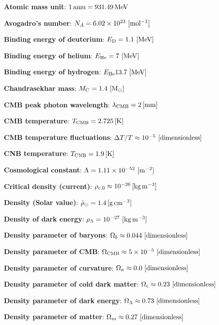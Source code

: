 \documentclass[a4paper,10pt]{article}
\begin{document}
{\noindent}\textbf{Atomic mass unit}: $1\,{\rm amu} = 931.49\,{\rm MeV}$

{\noindent}\textbf{Avogadro's number}: $N_A=6.02\times10^{23} ~ [{\rm mol^{-1}}]$

{\noindent}\textbf{Binding energy of deuterium}: $E_\mathrm{D} = 1.1 ~ [{\rm MeV}]$

{\noindent}\textbf{Binding energy of helium}: $E_\mathrm{He} = 7 ~ [{\rm MeV}]$

{\noindent}\textbf{Binding energy of hydrogen}: $E_\mathrm{He} 13.7 ~ [{\rm MeV}]$

{\noindent}\textbf{Chandrasekhar mass}: $M_C = 1.4 ~ [{\rm M_\odot}]$

{\noindent}\textbf{CMB peak photon wavelength}: $\lambda_\mathrm{CMB} = 2\,[{\rm mm}]$

{\noindent}\textbf{CMB temperature}: $T_\mathrm{CMB} = 2.725\,[{\rm K}]$

{\noindent}\textbf{CMB temperature fluctuations}: $\Delta T/T\approx10^{-5} ~ [{\rm dimensionless}]$

{\noindent}\textbf{CNB temperature}: $T_\mathrm{CNB} = 1.9\,[{\rm K}]$

{\noindent}\textbf{Cosmological constant}: $\Lambda=1.11\times10^{-52} ~ [{\rm m^{-2}}]$

{\noindent}\textbf{Critical density (current)}: $\rho_{c,0}\approx10^{-26}\,[{\rm kg\,m^{-3}}]$

{\noindent}\textbf{Density (Solar value)}: $\bar{\rho}_\odot = 1.4\,[{\rm g\,cm^{-3}}]$

{\noindent}\textbf{Density of dark energy}: $\rho_\Lambda = 10^{-27} ~ [{\rm kg\,m^{-3}}]$

{\noindent}\textbf{Density parameter of baryons}: $\Omega_b \approx 0.044 ~ [{\rm dimensionless}]$

{\noindent}\textbf{Density parameter of CMB}: $\Omega_\mathrm{CMB} \approx 5\times10^{-5} ~ [{\rm dimensionless}]$

{\noindent}\textbf{Density parameter of curvature}: $\Omega_\kappa \approx 0.0 ~ [{\rm dimensionless}]$

{\noindent}\textbf{Density parameter of cold dark matter}: $\Omega_c \approx 0.23 ~ [{\rm dimensionless}]$

{\noindent}\textbf{Density parameter of dark energy}: $\Omega_\Lambda \approx 0.73 ~ [{\rm dimensionless}]$

{\noindent}\textbf{Density parameter of matter}: $\Omega_m \approx 0.27 ~ [{\rm dimensionless}]$
\end{document}
